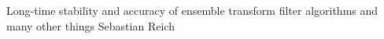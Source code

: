 \documentclass[english,URO]{sfb1294_1-poster}
\begin{document}
%
{Long-time stability and accuracy of ensemble transform filter algorithms and many other things}%
{Sebastian Reich}
%
%
\pagecolor{light-gray}
%
\end{document}
